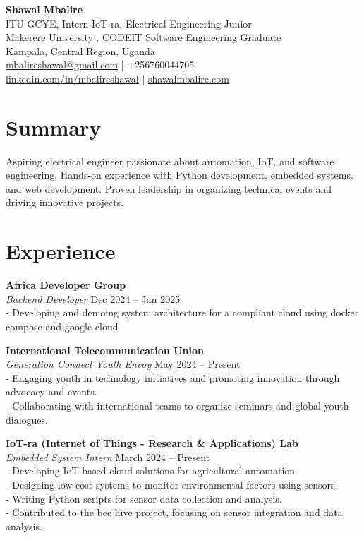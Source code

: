 \documentclass[a4paper,10pt]{article}
\begin{document}
\parindent=0pt

\begin{center}
    {\LARGE \textbf{Shawal Mbalire}}\\
    ITU GCYE, Intern IoT-ra, Electrical Engineering Junior\\
    Makerere University . CODEIT Software Engineering Graduate\\
    Kampala, Central Region, Uganda\\
    \href{mailto:mbalireshawal@gmail.com}{mbalireshawal@gmail.com} | +256760044705\\
    \href{https://www.linkedin.com/in/mbalireshawal}{linkedin.com/in/mbalireshawal} | \href{https://shawalmbalire.com}{shawalmbalire.com}
\end{center}

\section*{Summary}
Aspiring electrical engineer passionate about automation, IoT, and software engineering. Hands-on experience with Python development, embedded systems, and web development. Proven leadership in organizing technical events and driving innovative projects.

\section*{Experience}

\textbf{Africa Developer Group}\\
\textit{Backend Developer} \hfill Dec 2024 -- Jan 2025\\
- Developing and demoing system architecture for a compliant cloud using docker compose and google cloud

\textbf{International Telecommunication Union}\\
\textit{Generation Connect Youth Envoy} \hfill May 2024 -- Present\\
- Engaging youth in technology initiatives and promoting innovation through advocacy and events.\\
- Collaborating with international teams to organize seminars and global youth dialogues.

\textbf{IoT-ra (Internet of Things - Research \& Applications) Lab}\\
\textit{Embedded System Intern} \hfill March 2024 -- Present\\
- Developing IoT-based cloud solutions for agricultural automation.\\
- Designing low-cost systems to monitor environmental factors using sensors.\\
- Writing Python scripts for sensor data collection and analysis.\\
- Contributed to the bee hive project, focusing on sensor integration and data analysis.
\end{document}
